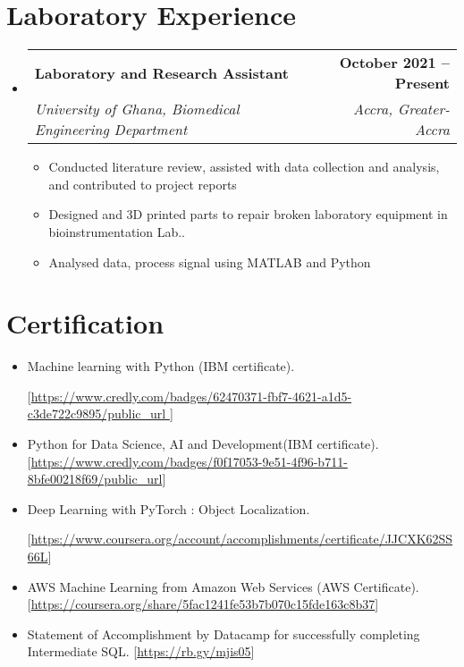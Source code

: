 \documentclass[letterpaper,11pt]{article}
\makeatletter
\newcommand{\resumeItem}[1]{
  \item\small{
    {#1 \vspace{-2pt}}
  }
}
\newcommand{\resumeSubheading}[4]{
  \vspace{-2pt}\item
    \begin{tabular*}{1.0\textwidth}[t]{l@{\extracolsep{\fill}}r}
      \textbf{#1} & \textbf{\small #2} \\
      \textit{\small#3} & \textit{\small #4} \\
    \end{tabular*}\vspace{-7pt}
}
\newcommand{\resumeSubHeadingListStart}{\begin{itemize}[leftmargin=0.0in, label={}]}
\newcommand{\resumeSubHeadingListEnd}{\end{itemize}}
\newcommand{\resumeItemListStart}{\begin{itemize}}
\newcommand{\resumeItemListEnd}{\end{itemize}\vspace{-5pt}}
\makeatother
\begin{document}
{{{{%
        
    
\section{Laboratory Experience}
  \resumeSubHeadingListStart

    \resumeSubheading
    { Laboratory and Research Assistant} {October 2021 --Present}
      {University of Ghana, Biomedical Engineering Department}{Accra, Greater-Accra}
      \resumeItemListStart
       
       \resumeItem{ Conducted literature review, assisted with data collection and analysis, and contributed to project reports}
    \resumeItem{Designed and 3D printed parts to repair broken laboratory equipment in bioinstrumentation Lab..}
    \resumeItem{Analysed data, process signal using MATLAB and Python}
      
     
      \resumeItemListEnd
       \resumeSubHeadingListEnd
\vspace{-16pt}


\section{Certification}
  
     \resumeItemListStart
     \resumeItem{Machine learning with Python (IBM certificate).}
     [\url{https://www.credly.com/badges/62470371-fbf7-4621-a1d5-c3de722c9895/public_url }]
      \resumeItem{Python for Data Science, AI and Development(IBM certificate).}[\url{https://www.credly.com/badges/f0f17053-9e51-4f96-b711-8bfe00218f69/public_url}] 
      \resumeItem{Deep Learning with PyTorch : Object Localization.}
     [\url{https://www.coursera.org/account/accomplishments/certificate/JJCXK62SS66L}]
     \resumeItem{AWS Machine Learning from Amazon Web Services (AWS Certificate).}[\url{https://coursera.org/share/5fac1241fe53b7b070c15fde163c8b37}]
     \resumeItem{Statement of Accomplishment by Datacamp for successfully completing Intermediate SQL.}[\url{https://rb.gy/mjis05}] 
      \resumeItemListEnd
}}}}
\end{document}
